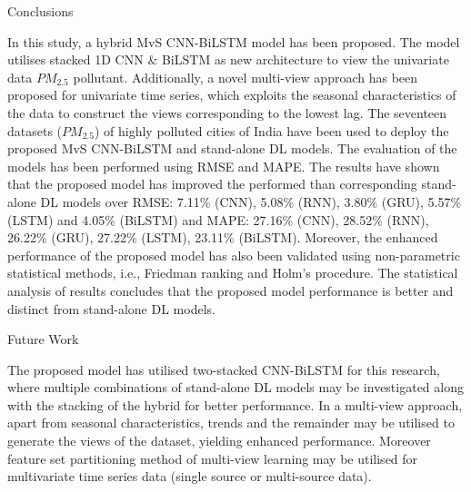 \documentclass[12pt, aspectratio=169]{beamer}
\begin{document}
\begin{frame}{Conclusions}
	\begin{block}{}
		\footnotesize {In this study, a hybrid MvS CNN-BiLSTM model has been proposed. The model utilises stacked 1D CNN \& BiLSTM as new architecture to view the univariate data $PM_{2.5}$ pollutant. Additionally, a novel multi-view approach has been proposed for univariate time series, which exploits the seasonal characteristics of the data to construct the views corresponding to the lowest lag. The seventeen datasets ($PM_{2.5}$) of highly polluted cities of India have been used to deploy the proposed MvS CNN-BiLSTM and stand-alone DL models. The evaluation of the models has been performed using RMSE and MAPE. The results have shown that the proposed model has improved the performed than corresponding stand-alone DL models over RMSE:  7.11\% (CNN), 5.08\% (RNN), 3.80\% (GRU), 5.57\% (LSTM) and 4.05\% (BiLSTM) and MAPE: 27.16\% (CNN), 28.52\% (RNN), 26.22\% (GRU), 27.22\% (LSTM), 23.11\% (BiLSTM). Moreover, the enhanced performance of the proposed model has also been validated using non-parametric statistical methods, i.e., Friedman ranking and Holm's procedure. The statistical analysis of results concludes that the proposed model performance is better and distinct from stand-alone DL models.}
	\end{block}
\end{frame}

\begin{frame}{Future Work}
	\begin{block}{}
		The proposed model has utilised two-stacked CNN-BiLSTM for this research, where multiple combinations of stand-alone DL models may be investigated along with the stacking of the hybrid for better performance. In a multi-view approach, apart from seasonal characteristics, trends and the remainder may be utilised to generate the views of the dataset, yielding enhanced performance. Moreover feature set partitioning method of multi-view learning may be utilised for multivariate time series data (single source or multi-source data).
	\end{block}
\end{frame}

\end{document}
